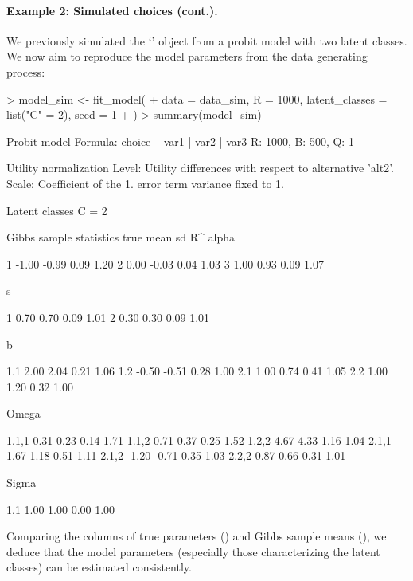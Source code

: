 \documentclass[article,shortnames]{jss}
\newcommand{\class}[1]{`\code{#1}'}
\begin{document}
\paragraph{Example 2: Simulated choices (cont.).}

We previously simulated the \class{RprobitB\_data} object  from a probit model with two latent classes. We now aim to reproduce the model parameters from the data generating process:

\begin{Schunk}
\begin{Sinput}
> model_sim <- fit_model(
+    data = data_sim, R = 1000, latent_classes = list("C" = 2), seed = 1
+  )
> summary(model_sim)
\end{Sinput}
\begin{Soutput}
Probit model
Formula: choice ~ var1 | var2 | var3
R: 1000, B: 500, Q: 1

Utility normalization
Level: Utility differences with respect to alternative 'alt2'.
Scale: Coefficient of the 1. error term variance fixed to 1.

Latent classes
C = 2

Gibbs sample statistics
          true    mean      sd      R^
 alpha

     1   -1.00   -0.99    0.09    1.20
     2    0.00   -0.03    0.04    1.03
     3    1.00    0.93    0.09    1.07

 s

     1    0.70    0.70    0.09    1.01
     2    0.30    0.30    0.09    1.01

 b

   1.1    2.00    2.04    0.21    1.06
   1.2   -0.50   -0.51    0.28    1.00
   2.1    1.00    0.74    0.41    1.05
   2.2    1.00    1.20    0.32    1.00

 Omega

 1.1,1    0.31    0.23    0.14    1.71
 1.1,2    0.71    0.37    0.25    1.52
 1.2,2    4.67    4.33    1.16    1.04
 2.1,1    1.67    1.18    0.51    1.11
 2.1,2   -1.20   -0.71    0.35    1.03
 2.2,2    0.87    0.66    0.31    1.01

 Sigma

   1,1    1.00    1.00    0.00    1.00
\end{Soutput}
\end{Schunk}

Comparing the columns of true parameters () and Gibbs sample means (), we deduce that the model parameters (especially those characterizing the latent classes) can be estimated consistently.
\end{document}
